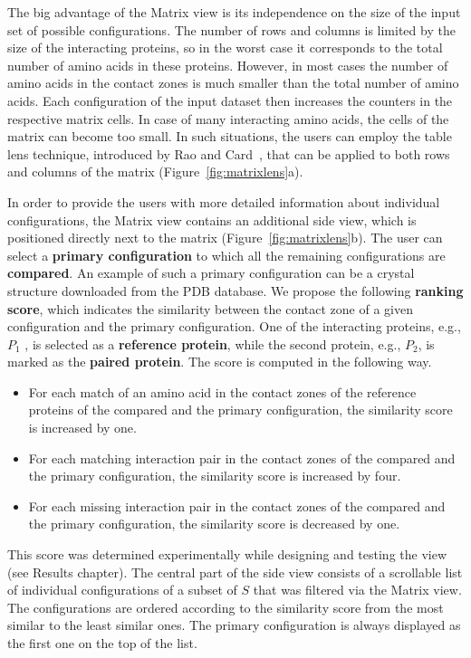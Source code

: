 \documentclass{bmcart}
\def\MatView {Matrix view\xspace}
\begin{document}
The big advantage of the \MatView is its independence on the size of the input set of possible configurations.
The number of rows and columns is limited by the size of the interacting proteins, so in the worst case it corresponds to the total number of amino acids in these proteins.
However, in most cases the number of amino acids in the contact zones is much smaller than the total number of amino acids.
Each configuration of the input dataset then increases the counters in the respective matrix cells.
In case of many interacting amino acids, the cells of the matrix can become too small.
In such situations, the users can employ the table lens technique, introduced by Rao and Card~\cite{Rao1994}, that can be applied to both rows and columns of the matrix (Figure~\ref{fig:matrixlens}a).

In order to provide the users with more detailed information about individual configurations, the \MatView contains an additional side view, which is positioned directly next to the matrix (Figure~\ref{fig:matrixlens}b).
The user can select a \textbf{primary configuration} to which all the remaining configurations are \textbf{compared}.
An example of such a primary configuration can be a crystal structure downloaded from the PDB database.
We propose the following \textbf{ranking score}, which indicates the similarity between the contact zone of a given configuration and the primary configuration.
One of the interacting proteins, e.g., $P_1$ , is selected as a \textbf{reference protein}, while the second protein, e.g., $P_2$, is marked as the \textbf{paired protein}.
The score is computed in the following way.
\begin{itemize}
\item For each match of an amino acid in the contact zones of the reference proteins of the compared and the primary configuration, the similarity score is increased by one.
\item For each matching interaction pair in the contact zones of the compared and the primary configuration, the similarity score is increased by four.
\item For each missing interaction pair in the contact zones of the compared and the primary configuration, the similarity score is decreased by one.
\end{itemize}
This score was determined experimentally while designing and testing the view (see Results chapter). 
The central part of the side view consists of a scrollable list of individual configurations of a subset of $S$ that was filtered via the \MatView.
The configurations are ordered according to the similarity score from the most similar to the least similar ones.
The primary configuration is always displayed as the first one on the top of the list.
\end{document}
